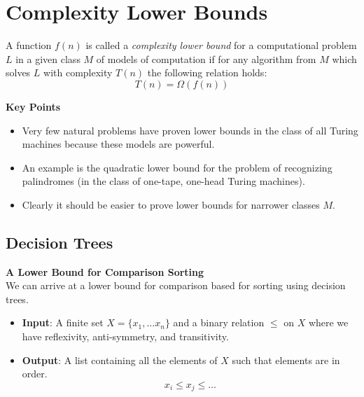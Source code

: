 \section{Complexity Lower Bounds}
\begin{definition}
    A function $f(n)$ is called a \textit{complexity lower bound}
    for a computational problem $L$
    in a given class $M$ of models of computation
    if for any algorithm from $M$ which solves $L$ with complexity $T(n)$ the following relation holds:
    $$T(n) = \Omega(f(n))$$
\end{definition}

\textbf{Key Points}
\begin{itemize}
    \item Very few natural problems have proven lower bounds in the class of all Turing machines because these models are powerful.
    \item An example is the quadratic lower bound for the problem of recognizing palindromes
        (in the class of one-tape, one-head Turing machines).
    \item Clearly it should be easier to prove lower bounds for narrower classes $M$.
\end{itemize}

\subsection{Decision Trees}
\textbf{A Lower Bound for Comparison Sorting}\\
We can arrive at a lower bound for comparison based for sorting using decision trees.

\begin{itemize}
    \item \textbf{Input}:
        A finite set $X = \{x_1,\dots x_n\}$ and
        a binary relation $\leq$ on $X$ where we have reflexivity, anti-symmetry, and transitivity.
    \item \textbf{Output}:
        A list containing all the elements of $X$ such that elements are in order.
        $$x_i \leq x_j \leq \dots$$
\end{itemize}

